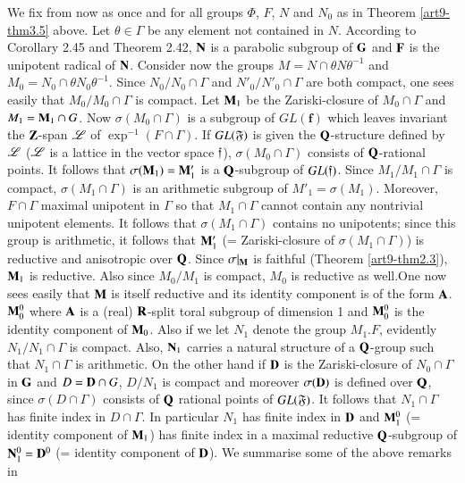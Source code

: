 We fix from now as once and for all groups $\Phi$, $F$, $N$ and $N_0$ as in Theorem \ref{art9-thm3.5} above. Let $\theta \in \Gamma$ be any element not contained in $N$. According to Corollary 2.45 and Theorem 2.42, $\mathbf{N}$ is a parabolic subgroup of $\mathbf{G}$ and $\mathbf{F}$ is the unipotent radical of $\mathbf{N}$. Consider now the groups $M =N \cap \theta N \theta^{-1}$ and $M_0 = N_0 \cap \theta N_0 \theta^{-1}$. Since $N_0 / N_0 \cap \Gamma$ and $N'_0 / N'_0 \cap \Gamma $ are both compact, one sees easily that $M_0/M_0 \cap \Gamma$ is compact. Let $\mathbf{M}_1$ be the Zariski-closure of $M_0 \cap \Gamma$ and $M_1 = \mathbf{M}_1 \cap G$. Now $\sigma (M_0 \cap \Gamma)$ is a subgroup of $GL (\textbf{f})$ which leaves invariant the $\mathbf{Z}$-span $\mathscr{L}$ of $\exp^{-1} (F \cap \Gamma)$. If $GL (\mathfrak{F})$ is given the $\mathbf{Q}$-structure defined by $\mathscr{L}$ ($\mathscr{L}$ is a lattice in the vector space $\mathfrak{f}$), $\sigma (M_0 \cap \Gamma)$ consists of $\mathbf{Q}$-rational points. It follows that $\sigma (\mathbf{M}_1) = \mathbf{M}'_1$ is a $\mathbf{Q}$-subgroup of $GL (\mathfrak{f})$. Since $M_1 / M_1 \cap \Gamma$ is compact, $\sigma (M_1 \cap \Gamma)$ is an arithmetic subgroup of $M'_1 = \sigma (M_1)$. Moreover, $F \cap \Gamma$ maximal unipotent in $\Gamma$ so that $M_1 \cap \Gamma$ cannot contain any nontrivial unipotent elements. It follows that $\sigma (M_1 \cap \Gamma)$ contains no unipotents; since this group is arithmetic, it follows that $\mathbf{M}'_1$ (= Zariski-closure of $\sigma (M_1 \cap \Gamma)$) is reductive and anisotropic over $\mathbf{Q}$. Since $\sigma|_{\mathbf{M}}$ is faithful (Theorem \ref{art9-thm2.3}), $\mathbf{M}_1$ is reductive. Also since $M_0 /M_1$ is compact, $M_0$ is reductive as well.\pageoriginale One now sees easily that $\mathbf{M}$ is itself reductive and its identity component is of the form $\mathbf{A}$. $\mathbf{M}^0_0$ where $\mathbf{A}$ is a (real) $\mathbf{R}$-split toral subgroup of dimension 1 and $\mathbf{M}^0_0$ is the identity component of $\mathbf{M}_0$. Also if we let $N_1$ denote the group $M_1. F$, evidently $N_1 / N_1 \cap \Gamma$ is compact. Also, $\mathbf{N}_1$ carries a natural structure of a $\mathbf{Q}$-group such that $N_1 \cap \Gamma$ is arithmetic. On the other hand if $\mathbf{D}$ is the Zariski-closure of $N_0 \cap \Gamma$ in $\mathbf{G}$ and $D = \mathbf{D} \cap G$, $D/ N_1$ is compact and moreover $\sigma (\mathbf{D})$ is defined over $\mathbf{Q}$, since $\sigma(D \cap \Gamma)$ consists of $\mathbf{Q}$ rational points of $GL (\mathfrak{F})$. It follows that $N_1 \cap \Gamma$ has finite index in $D \cap \Gamma$. In particular $N_1$ has finite index in $\mathbf{D}$ and $\mathbf{M}^0_1$ (= identity component of $\mathbf{M}_1$) has finite index in a maximal reductive $\mathbf{Q}$-subgroup of $\mathbf{N}^0_1 = \mathbf{D}^0$ (= identity component of $\mathbf{D}$). We summarise some of the above remarks in 

